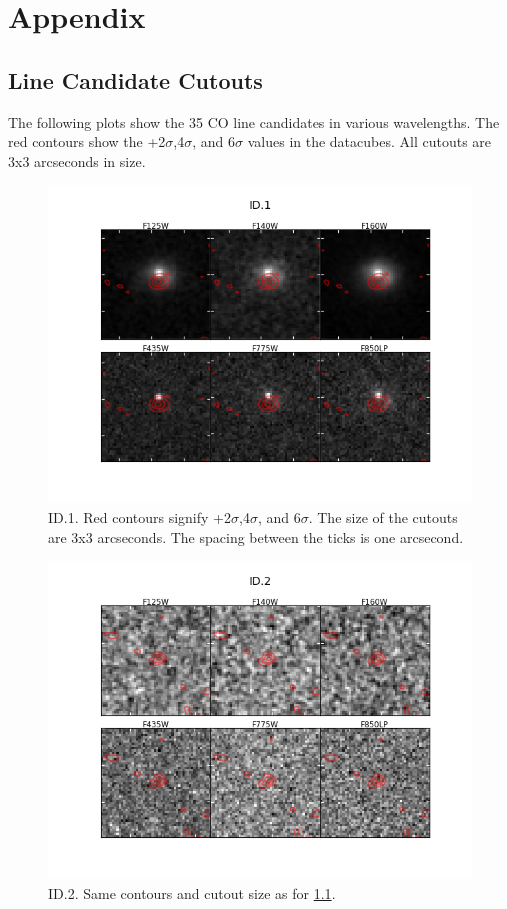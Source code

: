 \chapter{Appendix}

\section{Line Candidate Cutouts}\label{sec:A1}

The following plots show the 35 CO line candidates in various wavelengths. The red contours show the +2$\sigma$,4$\sigma$, and 6$\sigma$ values in the datacubes. All cutouts are 3x3 arcseconds in size.

\begin{figure}[tbp]
\centering \includegraphics[width=160mm]{Matched/ASPECS_Cutout_0.png}
\caption{ID.1. Red contours signify +2$\sigma$,4$\sigma$, and 6$\sigma$. The size of the cutouts are 3x3 arcseconds. The spacing between the ticks is one arcsecond.}
\label{fig:Match_One}
\end{figure}

\begin{figure}[tbp]
\centering \includegraphics[width=160mm]{Matched/ASPECS_Cutout_1.png}
\caption{ID.2. Same contours and cutout size as for \ref{fig:Match_One}.}
\label{fig:Match_Two}
\end{figure}


